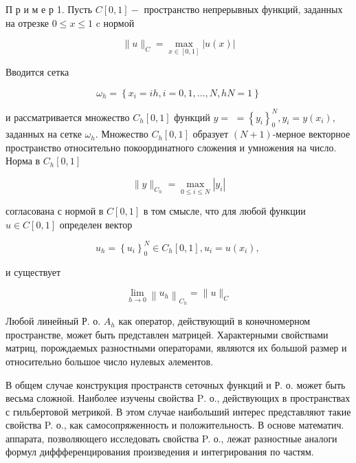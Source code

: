 \documentclass[10pt]{article}
\begin{document}
П р и м е р 1. Пусть $C[0,1]-$ пространство непрерывных функций, заданных на отрезке $0 \leqslant x \leqslant 1$ c нормой



\[

\|u\|_{C}=\max _{x \in[0,1]}|u(x)|

\]



Вводится сетка



\[

\omega_{h}=\left\{x_{i}=i h, i=0,1, \ldots, N, h N=1\right\}

\]



и рассматривается множество $C_{h}[0,1]$ функций $y=$ $=\left\{y_{i}\right\}_{0}^{N}, y_{i}=y\left(x_{i}\right)$, заданных на сетке $\omega_{h}$. Множество $C_{h}[0,1]$ образует $(N+1)$-мерное векторное пространство относительно покоординатного сложения и умножения на число. Норма в $C_{h}[0,1]$



\[

\|y\|_{C_{h}}=\max _{0 \leqslant i \leqslant N}\left|y_{i}\right|

\]



согласована с нормой в $C[0,1]$ в том смысле, что для любой функции $u \in C[0,1]$ определен вектор



\[

u_{h}=\left\{u_{i}\right\}_{0}^{N} \in C_{h}[0,1], u_{i}=u\left(x_{i}\right) \text {, }

\]



и существует



\[

\lim _{h \rightarrow 0}\left\|u_{h}\right\|_{C_{h}}=\|u\|_{C}

\]



Любой линейный Р. о. $A_{h}$ как оператор, действующий в конөчномерном пространстве, может быть представлен матрицей. Характерными свойствами матриц, порождаемых разностными операторами, являются их большой размер и относительно большое число нулевых әлементов.



В общем случае конструкция пространств сеточных функций и Р. о. может быть весьма сложной. Наиболее изучены свойства $\mathrm{P}$. о., действующих в пространствах с гильбертовой метрикой. В этом случае наибольший интерес представляют такие свойства P. о., как самосопряженность и положительность. В основе математич. аппарата, позволяющего исследовать свойства P. о., лежат разностные аналоги формул диффференцирования произведения и интегрирования по частям.
\end{document}

